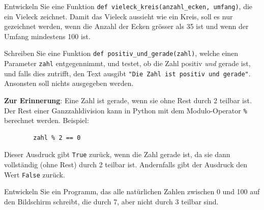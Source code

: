 \begin{myexercise}
	Entwickeln Sie eine Funktion \lstinline|def vieleck_kreis(anzahl_ecken, umfang)|, die ein Vieleck zeichnet. Damit das Vieleck aussieht wie ein Kreis, soll es nur gezeichnet werden, wenn die Anzahl der Ecken grösser als 35 ist und wenn der Umfang mindestens 100 ist.
	\begin{myanswer}
		
	\end{myanswer}
\end{myexercise}

\begin{myexercise}\label{ex:posUndGerade}
	Schreiben Sie eine Funktion \lstinline|def positiv_und_gerade(zahl)|, welche einen Parameter \lstinline|zahl| entgegennimmt, und testet, ob die Zahl positiv \textit{und} gerade ist, und falls dies zutrifft, den Text ausgibt \lstinline|"Die Zahl ist positiv und gerade"|. Ansonsten soll nichts ausgegeben werden.

	\textbf{Zur Erinnerung}: Eine Zahl ist gerade, wenn sie ohne Rest durch 2 teilbar ist. Der Rest einer Ganzzahldivision kann in Python mit dem Modulo-Operator \lstinline|%| berechnet werden. Beispiel:
	\begin{lstlisting}
		zahl % 2 == 0
	\end{lstlisting}
	Dieser Ausdruck gibt \lstinline|True| zurück, wenn die Zahl gerade ist, da sie dann vollständig (ohne Rest) durch 2 teilbar ist. Andernfalls gibt der Ausdruck den Wert \lstinline|False| zurück.


	\begin{myanswer}
		
	\end{myanswer}
\end{myexercise}

\begin{myexercise}
	Entwickeln Sie ein Programm, das alle natürlichen Zahlen zwischen 0 und 100 auf den Bildschirm schreibt, die durch 7, aber nicht durch 3 teilbar sind.
	\begin{myanswer}
		
	\end{myanswer}
\end{myexercise}

